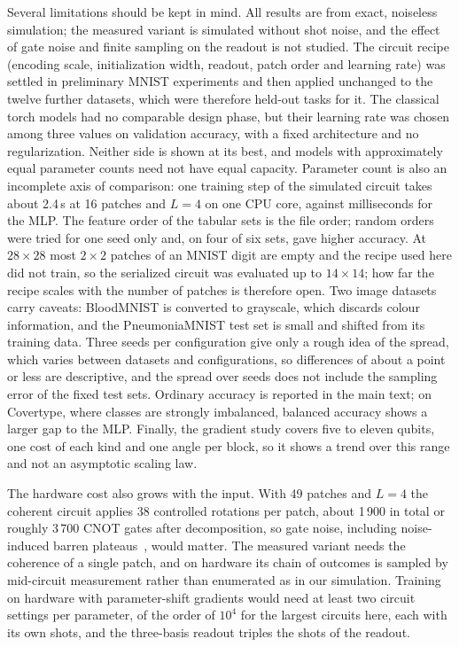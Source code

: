 \documentclass[11pt]{article}
\begin{document}
Several limitations should be kept in mind. All results are from exact, noiseless simulation; the measured variant is simulated without shot noise, and the effect of gate noise and finite sampling on the readout is not studied. The circuit recipe (encoding scale, initialization width, readout, patch order and learning rate) was settled in preliminary MNIST experiments and then applied unchanged to the twelve further datasets, which were therefore held-out tasks for it. The classical torch models had no comparable design phase, but their learning rate was chosen among three values on validation accuracy, with a fixed architecture and no regularization. Neither side is shown at its best, and models with approximately equal parameter counts need not have equal capacity. Parameter count is also an incomplete axis of comparison: one training step of the simulated circuit takes about 2.4\,s at 16 patches and $L=4$ on one CPU core, against milliseconds for the MLP. The feature order of the tabular sets is the file order; random orders were tried for one seed only and, on four of six sets, gave higher accuracy. At $28\times28$ most $2\times2$ patches of an MNIST digit are empty and the recipe used here did not train, so the serialized circuit was evaluated up to $14\times14$; how far the recipe scales with the number of patches is therefore open. Two image datasets carry caveats: BloodMNIST is converted to grayscale, which discards colour information, and the PneumoniaMNIST test set is small and shifted from its training data. Three seeds per configuration give only a rough idea of the spread, which varies between datasets and configurations, so differences of about a point or less are descriptive, and the spread over seeds does not include the sampling error of the fixed test sets. Ordinary accuracy is reported in the main text; on Covertype, where classes are strongly imbalanced, balanced accuracy shows a larger gap to the MLP. Finally, the gradient study covers five to eleven qubits, one cost of each kind and one angle per block, so it shows a trend over this range and not an asymptotic scaling law.

The hardware cost also grows with the input. With 49 patches and $L=4$ the coherent circuit applies 38 controlled rotations per patch, about 1\,900 in total or roughly 3\,700 CNOT gates after decomposition, so gate noise, including noise-induced barren plateaus~\cite{wang2020noise}, would matter. The measured variant needs the coherence of a single patch, and on hardware its chain of outcomes is sampled by mid-circuit measurement rather than enumerated as in our simulation. Training on hardware with parameter-shift gradients would need at least two circuit settings per parameter, of the order of $10^4$ for the largest circuits here, each with its own shots, and the three-basis readout triples the shots of the readout.
\end{document}
